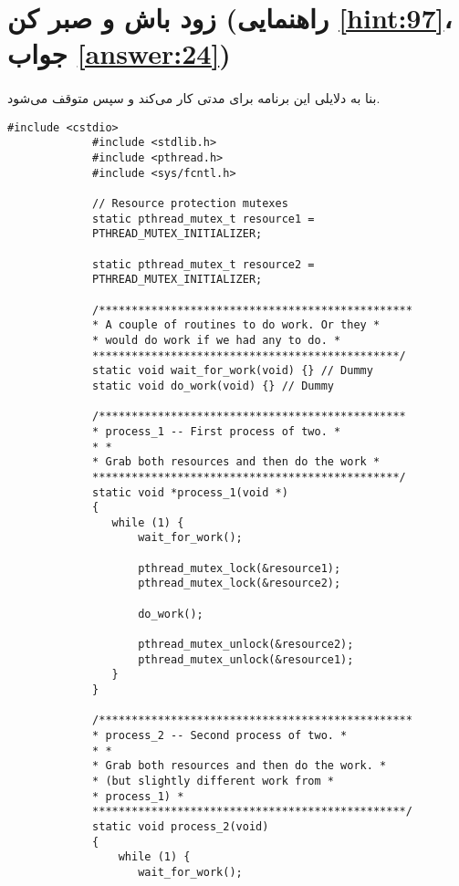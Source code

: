 \section[زود باش و صبر کن]{زود باش و صبر کن \protect{} (راهنمایی \ref{hint:97}، جواب \ref{answer:24})}
\paragraph{}\label{prog:112}
بنا به دلایلی این برنامه برای مدتی کار می‌کند و سپس متوقف می‌شود.

\begin{LTR}
        \begin{lstlisting}[style=C++Style]
             #include <cstdio>
             #include <stdlib.h>
             #include <pthread.h>
             #include <sys/fcntl.h>

             // Resource protection mutexes
             static pthread_mutex_t resource1 =
             PTHREAD_MUTEX_INITIALIZER;

             static pthread_mutex_t resource2 =
             PTHREAD_MUTEX_INITIALIZER;

             /************************************************
             * A couple of routines to do work. Or they *
             * would do work if we had any to do. *
             ***********************************************/
             static void wait_for_work(void) {} // Dummy
             static void do_work(void) {} // Dummy

             /***********************************************
             * process_1 -- First process of two. *
             * *
             * Grab both resources and then do the work *
             ***********************************************/
             static void *process_1(void *)
             {
             	while (1) {
             		wait_for_work();

             		pthread_mutex_lock(&resource1);
             		pthread_mutex_lock(&resource2);

             		do_work();

             		pthread_mutex_unlock(&resource2);
             		pthread_mutex_unlock(&resource1);
             	}
             }

             /************************************************
             * process_2 -- Second process of two. *
             * *
             * Grab both resources and then do the work. *
             * (but slightly different work from *
             * process_1) *
             ************************************************/
             static void process_2(void)
             {
            	 while (1) {
             		wait_for_work();


\end{lstlisting}
\end{LTR}
